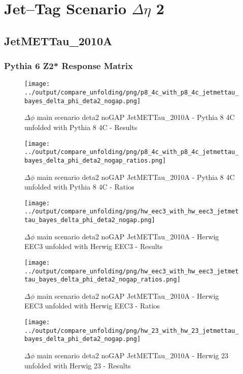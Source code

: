 \documentclass[11pt]{book}
\begin{document}
\newpage
\chapter{Jet--Tag Scenario $\Delta\eta$ 2}
\section{JetMETTau\_2010A}
\subsection{Pythia 6 Z2* Response Matrix}



\begin{figure}[ht]
\centering
\texttt{[image: ../output/compare\_unfolding/png/p8\_4c\_with\_p8\_4c\_jetmettau\_bayes\_delta\_phi\_deta2\_nogap.png]}
\caption{$\Delta\phi$ main scenario deta2 noGAP JetMETTau\_2010A - Pythia 8 4C unfolded with Pythia 8 4C - Results}
\label{p8_p8_jetmettau_bayes_delta_phi_deta2_nogap_a}
\end{figure}

\begin{figure}[ht]
\centering
\texttt{[image: ../output/compare\_unfolding/png/p8\_4c\_with\_p8\_4c\_jetmettau\_bayes\_delta\_phi\_deta2\_nogap\_ratios.png]}
\caption{$\Delta\phi$ main scenario deta2 noGAP JetMETTau\_2010A - Pythia 8 4C unfolded with Pythia 8 4C - Ratios}
\label{p8_p8_jetmettau_bayes_delta_phi_deta2_nogap_b}
\end{figure}

\begin{figure}[ht]
\centering
\texttt{[image: ../output/compare\_unfolding/png/hw\_eec3\_with\_hw\_eec3\_jetmettau\_bayes\_delta\_phi\_deta2\_nogap.png]}
\caption{$\Delta\phi$ main scenario deta2 noGAP JetMETTau\_2010A - Herwig EEC3 unfolded with Herwig EEC3 - Results}
\label{hw_eec3_hw_eec3_jetmettau_bayes_delta_phi_deta2_nogap_a}
\end{figure}

\begin{figure}[ht]
\centering
\texttt{[image: ../output/compare\_unfolding/png/hw\_eec3\_with\_hw\_eec3\_jetmettau\_bayes\_delta\_phi\_deta2\_nogap\_ratios.png]}
\caption{$\Delta\phi$ main scenario deta2 noGAP JetMETTau\_2010A - Herwig EEC3 unfolded with Herwig EEC3 - Ratios}
\label{hw_eec3_hw_eec3_jetmettau_bayes_delta_phi_deta2_nogap_b}
\end{figure}

\begin{figure}[ht]
\centering
\texttt{[image: ../output/compare\_unfolding/png/hw\_23\_with\_hw\_23\_jetmettau\_bayes\_delta\_phi\_deta2\_nogap.png]}
\caption{$\Delta\phi$ main scenario deta2 noGAP JetMETTau\_2010A - Herwig 23 unfolded with Herwig 23 - Results}
\label{hw_23_hw_23_jetmettau_bayes_delta_phi_deta2_nogap_a}
\end{figure}
\end{document}
